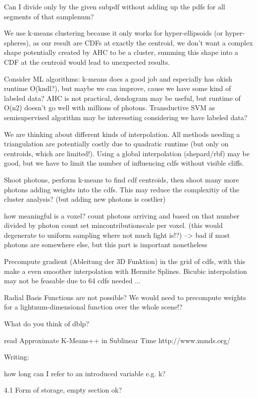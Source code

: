 Can I divide only by the given subpdf without adding up the pdfs for all segments of that samplenum?

We use k-means clustering because it only works for hyper-ellipsoids (or hyper-spheres), as our result are CDFs at exactly the centroid, we don't want a complex shape potentially created by AHC to be a cluster, summing this shape into a CDF at the centroid would lead to unexpected results.

Consider ML algorithms: k-means does a good job and especially has okish runtime O(kndl?), but maybe we can improve, cause we have some kind of labeled data? AHC is not practical, dendogram may be useful, but runtime of O(n2) doesn't go well with millions of photons. Transductive SVM as semisupervised algorithm may be interessting considering we have labeled data? 

We are thinking about different kinds of interpolation. All methods needing a triangulation are potentially costly due to quadratic runtime (but only on centroids, which are limited!). Using a global interpolation (shepard/rbf) may be good, but we have to limit the number of influencing cdfs without visible cliffs.

Shoot photons, perform k-means to find cdf centroids, then shoot many more photons adding weights into the cdfs. This may reduce the complexitiy of the cluster analysis? (but adding new photons is costlier)

how meaningful is a voxel? count photons arriving and based on that number divided by photon count set mincontributionscale per voxel. (this would degenerate to uniform sampling where not much light is!?) --> bad if most photons are somewhere else, but this part is important nonetheless

Precompute gradient (Ableitung der 3D Funktion) in the grid of cdfs, with this make a even smoother interpolation with Hermite Splines. Bicubic interpolation may not be feasable due to 64 cdfs needed ...

Radial Basis Functions are not possible? We would need to precompute weights for a lightnum-dimensional function over the whole scene!?

What do you think of dblp?

read
Approximate K-Means++ in Sublinear Time
http://www.mmds.org/



Writing:

how long can I refer to an introduced variable e.g. k?

4.1 Form of storage, empty section ok?